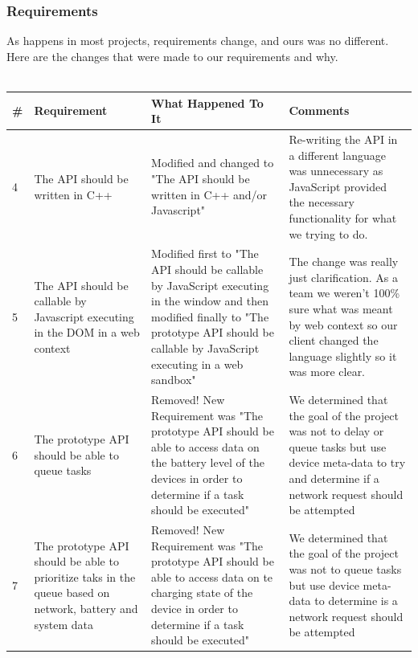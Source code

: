 \documentclass[12pt]{article}
\begin{document}
\subsubsection{Requirements}
As happens in most projects, requirements change, and ours was no different. Here are the changes that were made to our requirements and why.\\\\
\begin{tabularx}{\textwidth}{|p{1cm}|X|X|X|}
\hline
\#  & Requirement 				& What Happened To It & Comments \\ \hline
4 & The API should be written in C++ & Modified and changed to "The API should be written in C++ and/or Javascript" & Re-writing the API in a different language was unnecessary as JavaScript provided the necessary functionality for what we trying to do. \\ \hline
5 & The API should be callable by Javascript executing in the DOM in a web context & Modified first to "The API should be callable by JavaScript executing in the window and then modified finally to "The prototype API should be callable by JavaScript executing in a web sandbox" & The change was really just clarification.  As a team we weren't 100\% sure what was meant by web context so our client changed the language slightly so it was more clear. \\ \hline
6 & The prototype API should be able to queue tasks & Removed! New Requirement was "The prototype API should be able to access data on the battery level of the devices in order to determine if a task should be executed" & We determined that the goal of the project was not to delay or queue tasks but use device meta-data to try and determine if a network request should be attempted \\ \hline
7 & The prototype API should be able to prioritize taks in the queue based on network, battery and system data & Removed! New Requirement was "The prototype API should be able to access data on te charging state of the device in order to determine if a task should be executed" & We determined that the goal of the project was not to queue tasks but use device meta-data to determine is a network request should be attempted \\ \hline
\end{tabularx}
\pagebreak
\end{document}
